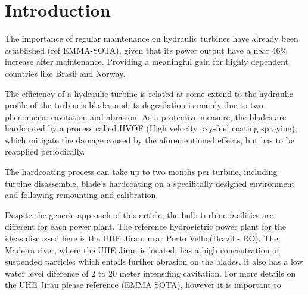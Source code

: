 \section{Introduction}


The importance of regular maintenance on hydraulic turbines have already been
established (ref EMMA-SOTA), given that its power output have a near 46\%
increase after maintenance. Providing a meaningful gain for highly dependent
countries like Brasil and Norway.


The efficiency of a hydraulic turbine is related at some extend to the hydraulic
profile of the turbine's blades and its degradation is mainly due to two
phenomena: cavitation and abrasion. As a protective measure, the blades are
hardcoated by a process called HVOF (High velocity oxy-fuel coating spraying),
which mitigate the damage caused by the aforementioned effects, but has to be
reapplied periodically.

The hardcoating process can take up to two months per turbine, including turbine
disassemble, blade's hardcoating on a specifically designed environment and
following remounting and calibration.



Despite the generic approach of this article, the bulb turbine facilities are
different for each power plant. The reference hydroeletric power plant for the
ideas discussed here is the UHE Jirau, near Porto Velho(Brazil - RO). The
Madeira river, where the UHE Jirau is located, has a high concentration of
suspended particles which entails further abrasion on the blades, it also has a
low water level diference of 2 to 20 meter intensifing cavitation. For more
details on the UHE Jirau please reference (EMMA SOTA), however it is important
to 

